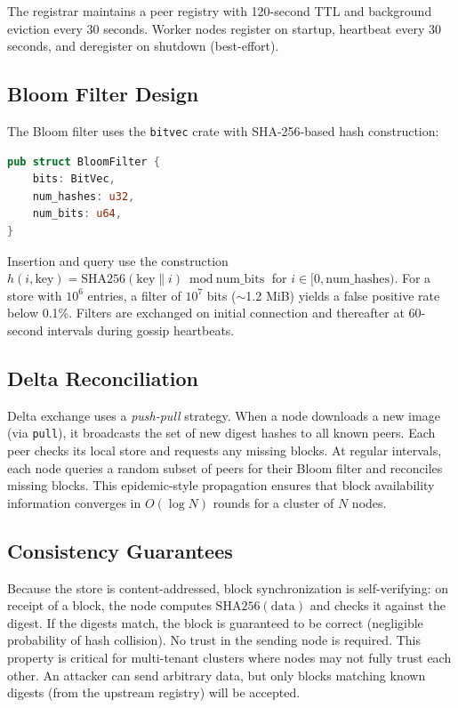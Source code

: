 \documentclass[11pt,a4paper]{article}
\begin{document}
The registrar maintains a peer registry with 120-second TTL and background eviction every 30 seconds. Worker nodes register on startup, heartbeat every 30 seconds, and deregister on shutdown (best-effort).

\subsection{Bloom Filter Design}

The Bloom filter uses the \texttt{bitvec} crate with SHA-256-based hash construction:

\begin{lstlisting}[language=Rust]
pub struct BloomFilter {
    bits: BitVec,
    num_hashes: u32,
    num_bits: u64,
}
\end{lstlisting}

Insertion and query use the construction $h(i, \text{key}) = \text{SHA256}(\text{key} \| i) \bmod \text{num\_bits}$ for $i \in [0, \text{num\_hashes})$. For a store with $10^6$ entries, a filter of $10^7$ bits ($\sim$1.2 MiB) yields a false positive rate below 0.1\%. Filters are exchanged on initial connection and thereafter at 60-second intervals during gossip heartbeats.

\subsection{Delta Reconciliation}

Delta exchange uses a \emph{push-pull} strategy. When a node downloads a new image (via \texttt{pull}), it broadcasts the set of new digest hashes to all known peers. Each peer checks its local store and requests any missing blocks. At regular intervals, each node queries a random subset of peers for their Bloom filter and reconciles missing blocks. This epidemic-style propagation ensures that block availability information converges in $O(\log N)$ rounds for a cluster of $N$ nodes.

\subsection{Consistency Guarantees}

Because the store is content-addressed, block synchronization is self-verifying: on receipt of a block, the node computes $\text{SHA256}(\text{data})$ and checks it against the digest. If the digests match, the block is guaranteed to be correct (negligible probability of hash collision). No trust in the sending node is required. This property is critical for multi-tenant clusters where nodes may not fully trust each other. An attacker can send arbitrary data, but only blocks matching known digests (from the upstream registry) will be accepted.
\end{document}
